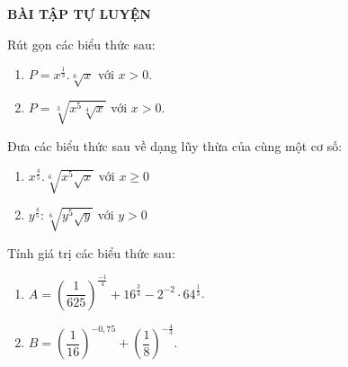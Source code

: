 \begin{center}
\textbf{BÀI TẬP TỰ LUYỆN }
\end{center}
\begin{bt}
Rút gọn các biểu thức sau: 
\begin{enumerate}
	\item $P={x}^{\tfrac{1}{3}}.\sqrt[6]{x}$ với $x>0$.
	\item $P=\sqrt[3]{x^5\sqrt[4]{x}}$ với $x>0$.
\end{enumerate}
\end{bt}
\begin{bt}%
	Đưa các biểu thức sau về dạng lũy thừa của cùng một cơ số: 
	\begin{multicols}{3}
		\begin{enumerate}
			\item ${x}^{\tfrac{4}{5}}.\sqrt[6]{x^5\sqrt{x}}$ với $x\geq 0$
			\item ${y}^{\tfrac{4}{5}}:\sqrt[6]{y^5\sqrt{y}}$ với $y > 0$
		\end{enumerate}
	\end{multicols} 
\end{bt}
\begin{bt}%
Tính giá trị các biểu thức sau:
\begin{enumerate}
	\item $A=\left(\dfrac{1}{625}\right)^{\tfrac{-1}{4}}+{16}^{\tfrac{3}{4}}-2^{-2}\cdot{64}^{\tfrac{1}{3}}$.
	\item $B=\left(\dfrac{1}{16}\right)^{-0,75}+\left(\dfrac{1}{8}\right)^{-\tfrac{4}{3}}$.
\end{enumerate}
\end{bt}
